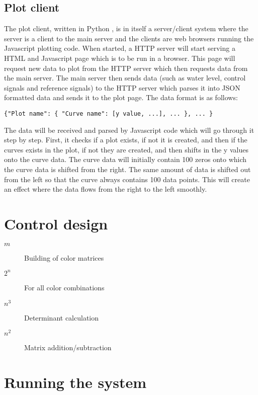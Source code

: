 \documentclass{article}
\begin{document}
\subsection{Plot client}
The plot client, written in Python \cite{python}, is in itself a server/client system where the server is a client to the main server and the clients are web browsers running the Javascript plotting code. When started, a HTTP server will start serving a HTML and Javascript page which is to be run in a browser. This page will request new data to plot from the HTTP server which then requests data from the main server. The main server then sends data (such as water level, control signals and reference signals) to the HTTP server which parses it into JSON \cite{json} formatted data and sends it to the plot page. The data format is as follows:
\begin{verbatim}
{"Plot name": { "Curve name": [y value, ...], ... }, ... }
\end{verbatim}
The data will be received and parsed by Javascript code which will go through it step by step. First, it checks if a plot exists, if not it is created, and then if the curves exists in the plot, if not they are created, and then shifts in the y values onto the curve data. The curve data will initially contain 100 zeros onto which the curve data is shifted from the right. The same amount of data is shifted out from the left so that the curve always contains 100 data points. This will create an effect where the data flows from the right to the left smoothly.

\section{Control design}
\begin{description}
\item[$m$] Building of color matrices
\item[$2^n$] For all color combinations
\item[$n^3$] Determinant calculation
\item[$n^2$] Matrix addition/subtraction
\end{description}


\section{Running the system}
\end{document}
